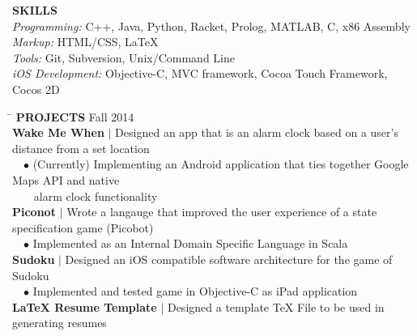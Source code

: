 \documentclass[11pt]{article}
\newcommand{\vb}{ $\mid$ }
\newcommand{\sectionNL}{\\[-2pt]}
\newcommand{\customtab}{$\hspace{10pt} \bullet \hspace{2pt}$}
\newcommand{\customtabinline}{$\hspace{23pt}$}
\begin{document}
\begin{flushleft}
{\textbf{SKILLS}} \sectionNL
\textit{Programming:} C++, Java, Python, Racket, Prolog, MATLAB, C, x86 Assembly\\
\textit{Markup:} HTML/CSS, LaTeX \\
\textit{Tools:} Git, Subversion, Unix/Command Line \\
\textit{iOS Development:} Objective-C, MVC framework, Cocoa Touch Framework, Cocos 2D %
\end{flushleft}

\begin{tabbing} 
\hspace*{6.5in}\= \kill
{\textbf{PROJECTS} } \> Fall 2014 \sectionNL

\textbf{Wake Me When} \vb Designed an app that is an alarm clock based on a user's distance from a set location \\
\customtab (Currently) Implementing an Android application that ties together Google Maps API and native \\ 
\customtabinline alarm clock functionality \\

\textbf{Piconot} \vb Wrote a langauge that improved the user experience of a state specification game (Picobot) \\
\customtab Implemented as an Internal Domain Specific Language in Scala \\
 
\textbf{Sudoku} \vb Designed an iOS compatible software architecture for the game of Sudoku \\
\customtab Implemented and tested game in Objective-C as iPad application \\

\textbf{LaTeX Resume Template} \vb Designed a template TeX File to be used in generating resumes


\end{tabbing} 
\end{document}
